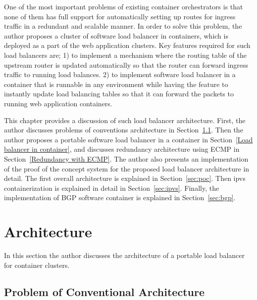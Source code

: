 One of the most important problems of existing container orchestrators is that none of them has full support for automatically setting up routes for ingress traffic in a redundant and scalable manner.
In order to solve this problem, the author proposes a cluster of software load balancer in containers, which is deployed as a part of the web application clusters.
Key features required for such load balancers are;
1) to implement a mechanism where the routing table of the upstream router is updated automatically so that the router can forward ingress traffic to running load balances.
2) to implement software load balancer in a container that is runnable in any environment while having the feature to instantly update load balancing tables so that it can forward the packets to running web application containers.

This chapter provides a discussion of such load balancer architecture.
First, the author discusses problems of conventions architecture in Section~\ref{Problem of Conventional Architecture}.
Then the author proposes a portable software load balancer in a container in Section~\ref{Load balancer in container}, and discusses redundancy architecture using ECMP in Section~\ref{Redundancy with ECMP}.
%
The author also presents an implementation of the proof of the concept system for the proposed load balancer architecture in detail.
The first overall architecture is explained in Section~\ref{sec:poc}.
Then ipvs containerization is explained in detail in Section~\ref{sec:ipvs}.
Finally, the implementation of BGP software container is explained in Section~\ref{sec:bgp}.

\section{Architecture}

In this section the author discusses the architecture of a portable load balancer for container clusters.

\subsection{Problem of Conventional Architecture}\label{Problem of Conventional Architecture}


